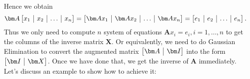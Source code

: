 Hence we obtain 
\[
\bm A\left[
\begin{array}{@{}c|c|c|c@{}}
x_1&x_2&\ldots&x_n
\end{array} \right] = \left[
\begin{array}{@{}c|c|c|c@{}}
\bm Ax_1&\bm Ax_2&\ldots&\bm Ax_n
\end{array} \right] = \left[
\begin{array}{@{}c|c|c|c@{}}
e_1&e_2&\ldots&e_n
\end{array} \right].
\]
Thus we only need to compute $n$ system of equations $\bm Ax_i = e_i, i=1,\dots,n$ to get the columns of the inverse matrix $\bm X$. Or equivalently, we need to do Gaussian Elimination to convert the augmented matrix $\left[
\begin{array}{@{}c|c@{}}
\bm A&\bm I
\end{array} \right]$ into the form $\left[
\begin{array}{@{}c|c@{}}
\bm I&\bm X
\end{array} \right]$. Once we have done that, we get the inverse of $\bm A$ immediately. Let's discuss an example to show how to achieve it:
